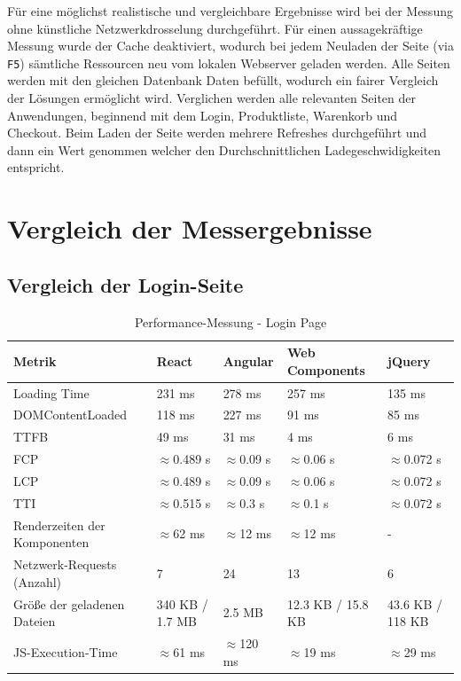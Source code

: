 \documentclass[oneside]{ausarbeitung}
\begin{document}
Für eine möglichst realistische und vergleichbare Ergebnisse wird bei der Messung ohne künstliche Netzwerkdrosselung durchgeführt. Für einen aussagekräftige Messung wurde der Cache deaktiviert, wodurch bei jedem Neuladen der Seite (via \texttt{F5}) sämtliche Ressourcen neu vom lokalen Webserver geladen werden. 
Alle Seiten werden mit den gleichen Datenbank Daten befüllt, wodurch ein fairer Vergleich der Lösungen ermöglicht wird. 
Verglichen werden alle relevanten Seiten der Anwendungen, beginnend mit dem Login, Produktliste, Warenkorb und Checkout.
Beim Laden der Seite werden mehrere Refreshes durchgeführt und dann ein Wert genommen welcher den Durchschnittlichen Ladegeschwidigkeiten entspricht.

\section{Vergleich der Messergebnisse}
\subsection{Vergleich der Login-Seite}

\begin{table}[H]
\centering
\caption{Performance-Messung - Login Page}
\begin{tabular}{|p{3.5cm}|p{2.5cm}|p{2.5cm}|p{2.5cm}|p{2.5cm}|}
\hline
\textbf{Metrik}                  & \textbf{React} & \textbf{Angular} & \textbf{Web Components} & \textbf{jQuery} \\ \hline
Loading Time                     & 231 ms        & 278 ms           & 257 ms                 & 135 ms          \\ \hline
DOMContentLoaded                 & 118 ms        & 227 ms           & 91 ms                  & 85 ms           \\ \hline
TTFB                             & 49 ms        & 31 ms            & 4 ms                   & 6 ms            \\ \hline
FCP                              & $\approx$0.489 s & $\approx$0.09 s & $\approx$0.06 s        & $\approx$0.072 s \\ \hline
LCP                              & $\approx$0.489 s & $\approx$0.09 s & $\approx$0.06 s        & $\approx$0.072 s \\ \hline
TTI                              & $\approx$0.515 s & $\approx$0.3 s & $\approx$0.1 s         & $\approx$0.072 s \\ \hline
Renderzeiten der Komponenten     & $\approx$62 ms & $\approx$12 ms   & $\approx$12 ms         & - \\ \hline
Netzwerk-Requests (Anzahl)       & 7              & 24               & 13                    & 6               \\ \hline
Größe der geladenen Dateien      & 340 KB / 1.7 MB & 2.5 MB          & 12.3 KB / 15.8 KB     & 43.6 KB / 118 KB \\ \hline
JS-Execution-Time                & $\approx$61 ms       & $\approx$120 ms          & $\approx$19 ms                 & $\approx$29 ms         \\ \hline
\end{tabular}
\end{table}
\end{document}
